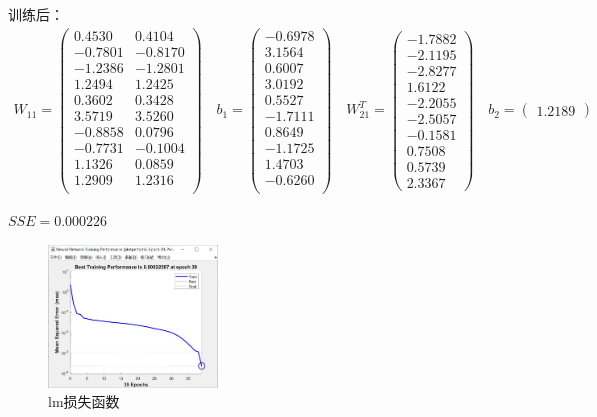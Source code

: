 \documentclass[UTF8]{article}
\begin{document}
训练后：
\begin{equation}
\nonumber
\begin{aligned}
W_{11} = 
\left(
\begin{matrix}
    0.4530  & 0.4104\\
   -0.7801 &  -0.8170\\
   -1.2386  & -1.2801\\
    1.2494  &  1.2425\\
    0.3602  &  0.3428\\
    3.5719  &  3.5260\\
   -0.8858  &  0.0796\\
   -0.7731  & -0.1004\\
    1.1326  &  0.0859\\
    1.2909  &  1.2316\\
\end{matrix}
\right)
\quad
b_{1} = 
\left(
\begin{matrix}
    -0.6978\\
    3.1564\\
    0.6007\\
    3.0192\\
    0.5527\\
   -1.7111\\
    0.8649\\
   -1.1725\\
    1.4703\\
   -0.6260\\
\end{matrix}
\right)
\quad
W_{21}^T = 
\left(
\begin{matrix}
    -1.7882 \\ -2.1195 \\  -2.8277  \\  1.6122   \\-2.2055  \\ -2.5057\\
   -0.1581 \\   0.7508 \\   0.5739 \\   2.3367
\end{matrix}
\right)
\quad
b_{2} = 
\left(
\begin{matrix}
    1.2189
\end{matrix}
\right)
\end{aligned}
\end{equation}
\begin{center}
$SSE = 0.000226$
\end{center}
\begin{figure}[H]
\centering
    \includegraphics[width=0.4\textwidth]{lm.jpg}
    \caption[0.3\textwidth]{lm损失函数}
\end{figure}
\end{document}
